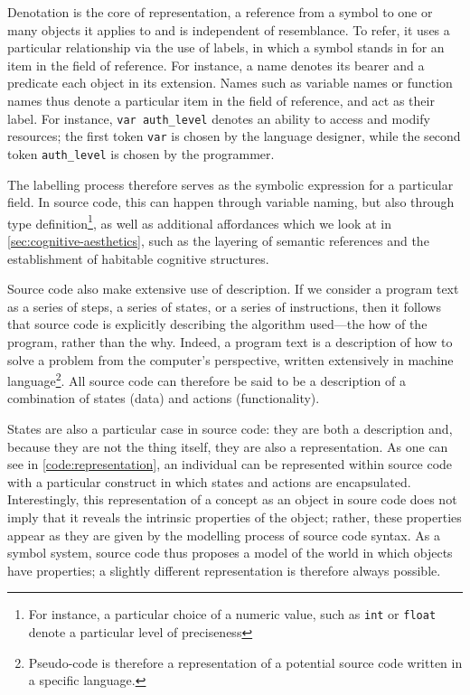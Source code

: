 Denotation is the core of representation, a reference from a symbol to one or many objects it applies to and is independent of resemblance. To refer, it uses a particular relationship via the use of labels, in which a symbol stands in for an item in the field of reference. For instance, a name denotes its bearer and a predicate each object in its extension. Names such as variable names or function names thus denote a particular item in the field of reference, and act as their label. For instance, \lstinline{var auth_level} denotes an ability to access and modify resources; the first token \lstinline{var} is chosen by the language designer, while the second token \lstinline{auth_level} is chosen by the programmer.

The labelling process therefore serves as the symbolic expression for a particular field. In source code, this can happen through variable naming, but also through type definition\footnote{For instance, a particular choice of a numeric value, such as \lstinline{int} or \lstinline{float} denote a particular level of preciseness}, as well as additional affordances which we look at in \autoref{sec:cognitive-aesthetics}, such as the layering of semantic references and the establishment of habitable cognitive structures.

Source code also make extensive use of description. If we consider a program text as a series of steps, a series of states, or a series of instructions, then it follows that source code is explicitly describing the algorithm used—the how of the program, rather than the why. Indeed, a program text is a description of how to solve a problem from the computer's perspective, written extensively in machine language\footnote{Pseudo-code is therefore a representation of a potential source code written in a specific language.}. All source code can therefore be said to be a description of a combination of states (data) and actions (functionality).

States are also a particular case in source code: they are both a description and, because they are not the thing itself, they are also a representation. As one can see in \autoref{code:representation}, an individual can be represented within source code with a particular construct in which states and actions are encapsulated. Interestingly, this representation of a concept as an object in soure code does not imply that it reveals the intrinsic properties of the object; rather, these properties appear as they are given by the modelling process of source code syntax. As a symbol system, source code thus proposes a model of the world in which objects have properties; a slightly different representation is therefore always possible.

